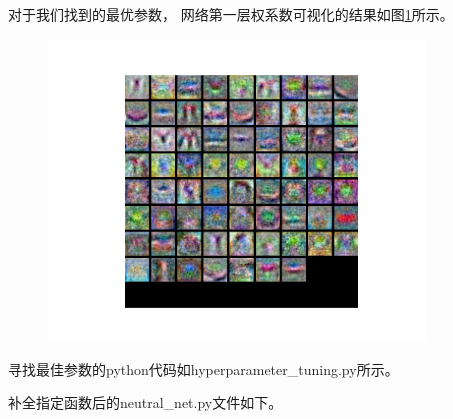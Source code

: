 \documentclass[a4paper]{article}
\begin{document}
\begin{enumerate}[label=\arabic*.]
  对于我们找到的最优参数， 网络第一层权系数可视化的结果如图\ref{fig:3}所示。

  \begin{figure}[!ht]
  \centering
  \caption{}\label{fig:3}
  \includegraphics[width=10cm]{a4/net_weights.jpg}
  \end{figure}
  
  寻找最佳参数的python代码如hyperparameter\_tuning.py所示。
  
  
  
  补全指定函数后的neutral\_net.py文件如下。
  
  

  \end{enumerate}
\end{document}
